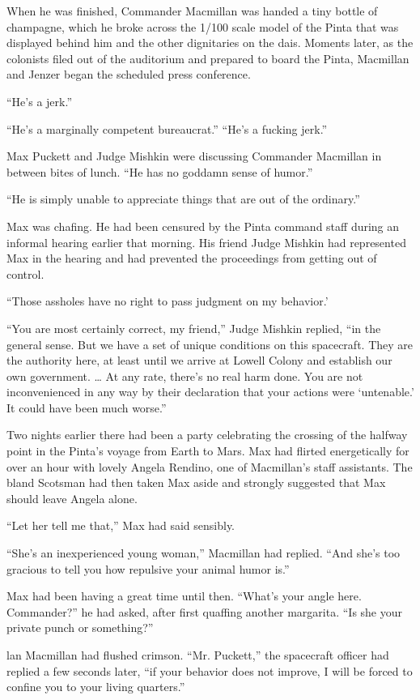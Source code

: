 \documentclass[]{article}
\begin{document}
{When he was finished, Commander Macmillan was handed a tiny bottle of champagne, which he broke across the 1/100 scale model of the Pinta that was displayed behind him and the other dignitaries on the dais. Moments later, as the colonists filed out of the auditorium and prepared to board the Pinta, Macmillan and Jenzer began the scheduled press conference.

“He’s a jerk.”

“He’s a marginally competent bureaucrat.” “He’s a fucking jerk.”

Max Puckett and Judge Mishkin were discussing Commander Macmillan in between bites of lunch. “He has no goddamn sense of humor.”

“He is simply unable to appreciate things that are out of the ordinary.”

Max was chafing. He had been censured by the Pinta command staff during an informal hearing earlier that morning. His friend Judge Mishkin had represented Max in the hearing and had prevented the proceedings from getting out of control.

“Those assholes have no right to pass judgment on my behavior.’

“You are most certainly correct, my friend,” Judge Mishkin replied, “in the general sense. But we have a set of unique conditions on this spacecraft. They are the authority here, at least until we arrive at Lowell Colony and establish our own government. … At any rate, there’s no real harm done. You are not inconvenienced in any way by their declaration that your actions were ‘untenable.’ It could have been much worse.”

Two nights earlier there had been a party celebrating the crossing of the halfway point in the Pinta’s voyage from Earth to Mars. Max had flirted energetically for over an hour with lovely Angela Rendino, one of Macmillan’s staff assistants. The bland Scotsman had then taken Max aside and strongly suggested that Max should leave Angela alone.

“Let her tell me that,” Max had said sensibly.

“She’s an inexperienced young woman,” Macmillan had replied. “And she’s too gracious to tell you how repulsive your animal humor is.”

Max had been having a great time until then. “What’s your angle here. Commander?” he had asked, after first quaffing another margarita. “Is she your private punch or something?”

lan Macmillan had flushed crimson. “Mr. Puckett,” the spacecraft officer had replied a few seconds later, “if your behavior does not improve, I will be forced to confine you to your living quarters.”

}
\end{document}
